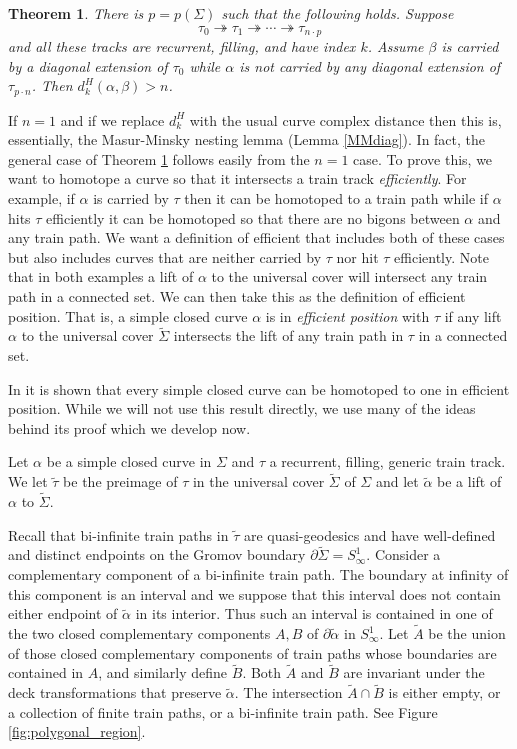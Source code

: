 \documentclass[11pt]{article}
\newtheorem{thm}{Theorem}[section]
\theoremstyle{remark}
\begin{document}
\begin{thm}\label{progress2}
  There is $p=p(\Sigma)$ such that the following holds.
  Suppose
  $$\tau_0\twoheadrightarrow\tau_1\twoheadrightarrow\cdots\twoheadrightarrow\tau_{n\cdot p}$$
  and all these tracks are recurrent, filling, and have index $k$.
  Assume $\beta$ is carried by a diagonal extension of $\tau_0$ while $\alpha$
  is not carried by any diagonal extension of
  $\tau_{p\cdot n}$. Then $d_k^H(\alpha,\beta)> n$.
\end{thm}

If $n=1$ and if we replace $d^H_k$ with the usual curve complex distance then this is, essentially, the Masur-Minsky nesting lemma (Lemma \ref{MMdiag}). In fact, the general case of Theorem \ref{progress2} follows easily from the $n=1$ case. To prove this, we want to homotope a curve so that it intersects a train track {\em efficiently}. For example, if $\alpha$ is carried by $\tau$ then it can be homotoped to a train path while if $\alpha$ hits  $\tau$ efficiently it can be homotoped so that there are no bigons between $\alpha$ and any train path. We want a definition of efficient that includes both of these cases but also includes curves that are neither carried by $\tau$ nor hit $\tau$ efficiently. Note that in both examples a lift of $\alpha$ to the universal cover will intersect any train path in a connected set.
We can then take this as the definition of efficient position. That is, a simple closed curve $\alpha$ is in {\em efficient position} with $\tau$ if any lift $\alpha$ to the universal cover $\tilde\Sigma$ intersects the lift of any train path in $\tau$ in a connected set.

 In \cite{MMS} it is shown that every simple closed curve can be homotoped to one in efficient position.
 While we will not use this result directly, we use many of the ideas behind its proof which we develop now.

Let $\alpha$ be a simple closed curve in $\Sigma$ and
$\tau$ a recurrent, filling, generic train track.
We let $\tilde\tau$ be the preimage of
$\tau$ in the universal cover $\tilde\Sigma$ of $\Sigma$ and let
$\tilde\alpha$ be a lift of $\alpha$ to $\tilde \Sigma$.

Recall that bi-infinite train paths in $\tilde\tau$ are
quasi-geodesics and have well-defined and distinct endpoints on the Gromov boundary
$\partial \tilde \Sigma = S^1_\infty$.
Consider a complementary component of a bi-infinite train
path. The boundary at infinity of this component is an interval and
we suppose that this interval does not
contain either endpoint of $\tilde\alpha$ in its interior. Thus such an interval is
contained in one of the two closed complementary components $A,B$ of
$\partial\tilde\alpha$ in $S^1_\infty$. Let $\tilde{A}$ be the union of
those closed complementary components of train paths
whose boundaries are contained in $A$, and
similarly define $\tilde{B}$. Both $\tilde{A}$ and $\tilde{B}$ are invariant
under the deck transformations that preserve $\tilde\alpha$. The
intersection $\tilde{A}\cap\tilde{B}$ is either empty, or a collection
of finite train paths, or a bi-infinite train path. See Figure
\ref{fig:polygonal_region}.
\end{document}
